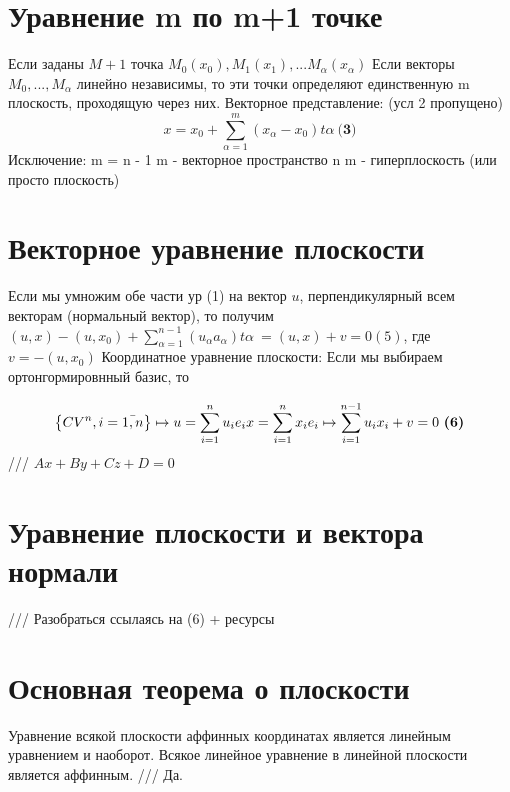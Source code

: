\documentclass{article}
\begin{document}
\section{Уравнение m по m+1 точке}
Если заданы \(M+1\) точка \( M_0(x_0),  M_1(x_1),  ...  M_{\alpha}(x_{\alpha})\)   \newline
Если векторы \(M_0, ..., M_{\alpha}\) линейно независимы, то эти точки определяют единственную m плоскость, проходящую через них. \newline
Векторное представление:  (усл 2 пропущено)
\[x = x_0 + \sum_{\alpha = 1}^{m}(x_{\alpha} - x_0) t\alpha\ \textbf{(3)}\]
Исключение: m = n - 1\newline
m - векторное пространство n\newline
m - гиперплоскость (или просто плоскость)\newline
\section{Векторное уравнение плоскости}
Если мы умножим обе части ур (1) на вектор \(u\), перпендикулярный всем векторам (нормальный вектор), то получим \( (u,x) - (u,x_0) + \sum_{\alpha = 1}^{n-1}(u_{\alpha} a_{\alpha}) t\alpha\ = (u,x) + v = 0 (5)\), где \(v = -(u, x_0)\)
\newline
Координатное уравнение плоскости:\newline
Если мы выбираем ортонгормировнный базис, то\newline

\[\left \{ CV^n, i= \bar{{1,n}} \right \} \mapsto u =  \sum_{i=1}^{n}u_{i}e_{i} \newline
x = \sum_{i=1}^{n}x_{i}e_{i} \mapsto \sum_{i=1}^{n-1}u_{i}x_{i} + v = 0  \text{  } \textbf{(6)}\]
/// \(Ax + By + Cz + D = 0\) 

\section{Уравнение плоскости и вектора нормали}
/// Разобраться ссылаясь на (6) + ресурсы 
\section{Основная теорема о плоскости}
Уравнение всякой плоскости аффинных координатах является линейным уравнением и наоборот. \newline
Всякое линейное уравнение в линейной плоскости является аффинным.
/// Да. 
\end{document}
